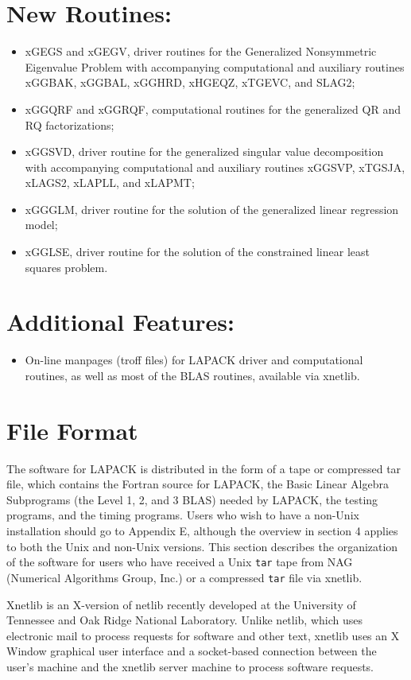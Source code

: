 \section*{New Routines:}
\begin{itemize}
\item xGEGS and xGEGV, driver routines for the Generalized Nonsymmetric
Eigenvalue Problem with accompanying computational and auxiliary
routines xGGBAK, xGGBAL, xGGHRD, xHGEQZ, xTGEVC, and SLAG2;
\item xGGQRF and xGGRQF, computational routines for the generalized QR
and RQ factorizations;
\item xGGSVD, driver routine for the generalized singular value
decomposition with accompanying computational and auxiliary routines
xGGSVP, xTGSJA, xLAGS2, xLAPLL, and xLAPMT;
\item xGGGLM, driver routine for the solution of the generalized linear
regression model;
\item xGGLSE, driver routine for the solution of the constrained linear
least squares problem.
\end{itemize}
\section*{Additional Features:}
\begin{itemize}
\item On-line manpages (troff files) for LAPACK driver and computational
routines, as well as most of the BLAS routines, available via xnetlib.
\end{itemize}

\section{File Format}

\dent
The software for LAPACK is distributed in the form of a tape or
compressed tar file,
which contains the Fortran source for LAPACK,
the Basic Linear Algebra Subprograms
(the Level 1, 2, and 3 BLAS) needed by LAPACK, the testing programs,
and the timing programs.
Users who wish to have a non-Unix installation should go to Appendix E,
although the overview in section 4 applies to both the Unix and non-Unix
versions.
This section describes the organization of the software for users who
have received a Unix {\tt tar} tape from NAG (Numerical Algorithms Group, Inc.)
or a compressed {\tt tar} file via xnetlib.

Xnetlib is an X-version of netlib recently developed at the University
of Tennessee and Oak Ridge National Laboratory.  Unlike netlib, which
uses electronic mail to process requests for software and other text,
xnetlib uses an X Window graphical user interface and a socket-based
connection between the user's machine and the xnetlib server machine to
process software requests.

